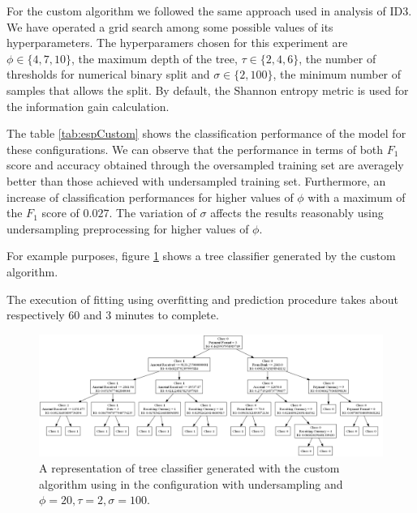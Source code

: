 \documentclass[12pt]{article}
\begin{document}
For the custom algorithm we followed the same approach used in analysis of ID3.
We have operated a grid search among some possible values of its hyperparameters.
The hyperparamers chosen for this experiment are $\phi \in \{4,7, 10\}$, the maximum depth of the tree, $\tau \in\{2,4,6\}$, the number of thresholds for numerical binary split and $\sigma \in \{2, 100\}$, the minimum number of samples that allows the split.
By default, the Shannon entropy metric is used for the information gain calculation.

The table \ref{tab:espCustom} shows the classification performance of the model for these configurations.
We can observe that the performance in terms of both $F_1$ score and accuracy obtained through the oversampled training set are averagely better than those achieved with undersampled training set.
Furthermore, an increase of classification performances for higher values of $\phi$ with a maximum of the $F_1$ score of $0.027$.
The variation of $\sigma$ affects the results reasonably using undersampling preprocessing for higher values of $\phi$.

For example purposes, figure \ref{fig:ex_custom_tree} shows a tree classifier generated by the custom algorithm.

The execution of fitting using overfitting and prediction procedure takes about respectively 60 and 3 minutes to complete.

\begin{figure}[htp]
    \centering
    \includegraphics[width = \textwidth]{img/tree-custom-undersampling-2-1000.png}
    \caption{A representation of tree classifier generated with the custom algorithm using in the configuration with undersampling and $\phi = 20, \tau = 2, \sigma = 100$.}
    \label{fig:ex_custom_tree}
\end{figure}
\end{document}

